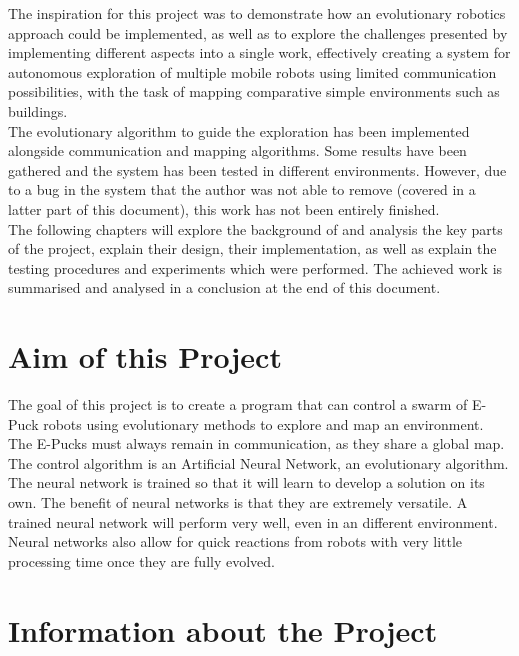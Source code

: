 The inspiration for this project was to demonstrate how an evolutionary robotics approach could be implemented, as well as to explore the challenges presented by implementing different aspects into a single work, effectively creating a system for autonomous exploration of multiple mobile robots using limited communication possibilities, with the task of mapping comparative simple environments such as buildings. \\

The evolutionary algorithm to guide the exploration has been implemented alongside communication and mapping algorithms. 
Some results have been gathered and the system has been tested in different environments. However, due to a bug in the system that the author was not able to remove (covered in a latter part of this document), this work has not been entirely finished. \\

The following chapters will explore the background of and analysis the key parts of the project, explain their design, their implementation, as well as explain the testing procedures and experiments which were performed. The achieved work is summarised and analysed in a conclusion at the end of this document.\\

\section{Aim of this Project}
The goal of this project is to create a program that can control a swarm of E-Puck robots using evolutionary methods to explore and  map an environment. 
The E-Pucks must always remain in communication, as they share a global map. 
The control algorithm is an Artificial Neural Network, an evolutionary algorithm. 
The neural network is trained so that it will learn to develop a solution on its own.
The benefit of neural networks is that they are extremely versatile. A trained neural network will perform very well, even in an different environment. Neural networks also allow for quick reactions from robots with very little processing time once they are fully evolved.  

\section{Information about the Project}
